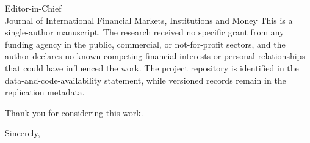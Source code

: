 \documentclass[10pt,a4paper]{letter}
\begin{document}
\begin{letter}{Editor-in-Chief\\Journal of International Financial Markets, Institutions and Money}
This is a single-author manuscript. The research received no specific grant from any funding agency in the public, commercial, or not-for-profit sectors, and the author declares no known competing financial interests or personal relationships that could have influenced the work. The project repository is identified in the data-and-code-availability statement, while versioned records remain in the replication metadata.

Thank you for considering this work.

\closing{Sincerely,}
\end{letter}
\end{document}
